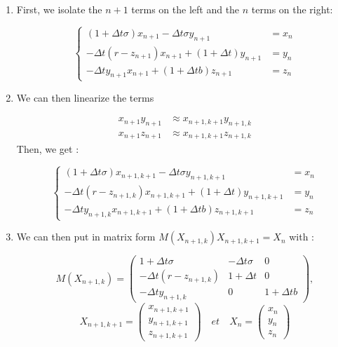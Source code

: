 \documentclass[12pt]{article}
\begin{document}
	\begin{enumerate}[label=\textbullet]
		\item First, we isolate the $n+1$ terms on the left and the $n$ terms on the right:
		
		$$\left\{\begin{aligned} 
			(1+\Delta t\sigma)x_{n+1}-\Delta t\sigma y_{n+1}&=x_n \\
			-\Delta t(r-z_{n+1})x_{n+1}+(1+\Delta t)y_{n+1}&=y_n \\
			-\Delta ty_{n+1}x_{n+1}+(1+\Delta tb)z_{n+1}&=z_n
		\end{aligned}\right.$$
	
		\item We can then linearize the terms 
		
		$$\begin{aligned}
			x_{n+1}y_{n+1}&\approx x_{n+1,k+1}y_{n+1,k} \\
			x_{n+1}z_{n+1}&\approx x_{n+1,k+1}z_{n+1,k}
		\end{aligned}$$ 		
		\noindent Then, we get :
		
		$$\left\{\begin{aligned} 
			(1+\Delta t\sigma)x_{n+1,k+1}-\Delta t\sigma y_{n+1,k+1}&=x_n \\
			-\Delta t(r-z_{n+1,k})x_{n+1,k+1}+(1+\Delta t)y_{n+1,k+1}&=y_n \\
			-\Delta ty_{n+1,k}x_{n+1,k+1}+(1+\Delta tb)z_{n+1,k+1}&=z_n
		\end{aligned}\right.$$
	
		\item We can then put in matrix form  $M(X_{n+1,k})X_{n+1,k+1}=X_n$ with :
		
		$$M(X_{n+1,k})=\begin{pmatrix}
			1+\Delta t\sigma & -\Delta t\sigma & 0 \\
			-\Delta t(r-z_{n+1,k}) & 1+\Delta t & 0 \\
			-\Delta ty_{n+1,k} & 0 & 1+\Delta tb
		\end{pmatrix},$$
		$$X_{n+1,k+1}=\begin{pmatrix}
			x_{n+1,k+1} \\
			y_{n+1,k+1} \\
			z_{n+1,k+1}
		\end{pmatrix} \quad et \quad X_n=\begin{pmatrix}
			x_n \\
			y_n \\
			z_n
		\end{pmatrix} $$
	\end{enumerate}
	
\end{document}
